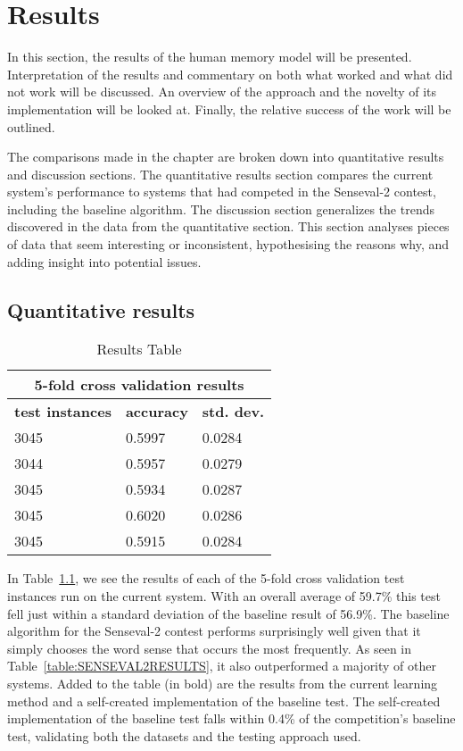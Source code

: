 \chapter{Results}

In this section, the results of the human memory model will be presented.
Interpretation of the results and commentary on both what worked and what did
not work will be discussed. An overview of the approach and the novelty of its
implementation will be looked at. Finally, the relative success of the work will
be outlined.

The comparisons made in the chapter are broken down into quantitative results
and discussion sections. The quantitative results section compares the current
system's performance to systems that had competed in the Senseval-2
contest, including the baseline algorithm.  The discussion section generalizes
the trends discovered in the data from the quantitative section. This section
analyses pieces of data that seem interesting or inconsistent, hypothesising the
reasons why, and adding insight into potential issues.

\section{Quantitative results}

\begin{table}[htp]
	\begin{center}
		\begin{tabular}{|l|l|l|}
			\hline
				\multicolumn{3}{|c|}{\bf 5-fold cross validation results } \\
				\hline
				{\bf test instances} & {\bf accuracy} & {\bf std. dev.} \\ \hline 
				3045 & 0.5997 & 0.0284    \\ \hline 
				3044 & 0.5957 & 0.0279 \\ \hline 
				3045 & 0.5934 & 0.0287 \\ \hline 
				3045 & 0.6020 & 0.0286 \\ \hline 
				3045 & 0.5915 & 0.0284 \\ \hline
		\end{tabular}
		\caption{Results Table \label{table:RESULTS}}
	\end{center}
\end{table}

In Table~\ref{table:RESULTS}, we see the results of each of the 5-fold cross
validation test instances run on the current system.  With an overall average of
59.7\% this test fell just within a standard deviation of the baseline result of
56.9\%. The baseline algorithm for the Senseval-2 contest performs surprisingly
well given that it simply chooses the word sense that occurs the most frequently.
As seen in Table~\ref{table:SENSEVAL2RESULTS}, it also outperformed a
majority of other systems. Added to the table (in bold) are the results from the
current learning method and a self-created implementation of the baseline test.
The self-created implementation of the baseline test falls within 0.4\% of the
competition's baseline test, validating both the datasets and the testing
approach used.

